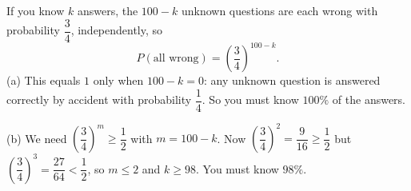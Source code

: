 If you know $k$ answers, the $100-k$ unknown questions are each wrong with probability $\dfrac{3}{4}$, independently, so
\[
P(\text{all wrong})=\left(\dfrac{3}{4}\right)^{100-k}.
\]
(a) This equals $1$ only when $100-k=0$: any unknown question is answered correctly by accident with probability $\dfrac{1}{4}$. So you must know $\boxed{100\%}$ of the answers.

(b) We need $\left(\dfrac{3}{4}\right)^{m}\ge\dfrac{1}{2}$ with $m=100-k$. Now $\left(\dfrac{3}{4}\right)^2=\dfrac{9}{16}\ge\dfrac{1}{2}$ but $\left(\dfrac{3}{4}\right)^3=\dfrac{27}{64}<\dfrac{1}{2}$, so $m\le2$ and $k\ge98$. You must know $\boxed{98\%}$.
